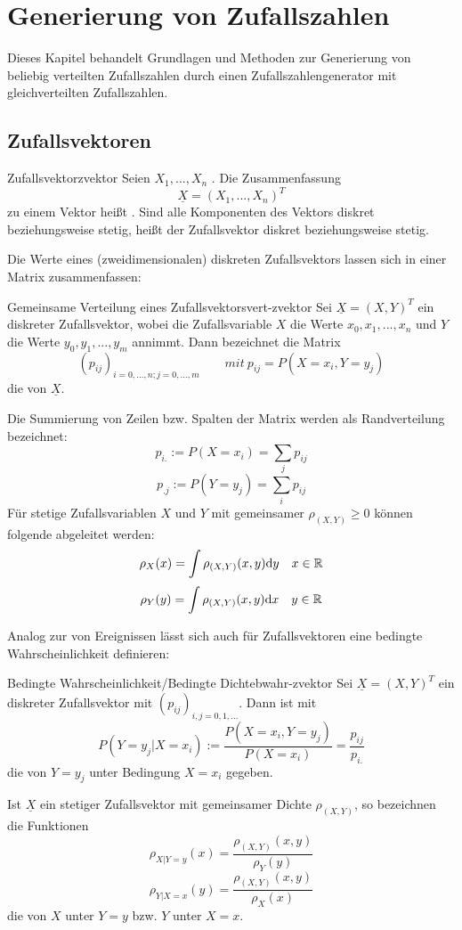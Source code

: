 \chapter{Generierung von Zufallszahlen}

Dieses Kapitel behandelt Grundlagen und Methoden zur Generierung von beliebig
verteilten Zufallszahlen durch einen Zufallszahlengenerator mit gleichverteilten
Zufallszahlen.

\section{Zufallsvektoren}

\begin{definition}{Zufallsvektor}{zvektor}
Seien $X_1, ..., X_n$ . Die Zusammenfassung
\[\underline{X} = (X_1, ..., X_n)^T\]
zu einem Vektor heißt . Sind alle Komponenten des Vektors
diskret beziehungsweise stetig, heißt der Zufallsvektor diskret beziehungsweise
stetig.
\end{definition}

Die Werte eines (zweidimensionalen) diskreten Zufallsvektors lassen sich in einer Matrix
zusammenfassen:

\begin{definition}{Gemeinsame Verteilung eines Zufallsvektors}{vert-zvektor}
Sei $\underline{X} = (X, Y)^T$ ein diskreter Zufallsvektor, wobei die
Zufallsvariable $X$ die Werte $x_0, x_1, ..., x_n$ und $Y$ die Werte $y_0, y_1, ...,
y_m$ annimmt. Dann bezeichnet die Matrix
\[(p_{ij})_{i=0,...,n;j=0,...,m} \qquad mit\ p_{ij} = P(X=x_i, Y=y_j)\]
die  von $\underline{X}$.
\end{definition}

Die Summierung von Zeilen bzw. Spalten der Matrix werden als Randverteilung
bezeichnet:
\[p_{i.}:=P(X=x_i) = \sum_j p_{ij}\]
\[p_{.j}:=P(Y=y_j) = \sum_i p_{ij}\]
Für stetige Zufallsvariablen $X$ und $Y$ mit gemeinsamer 
$\rho_{(X, Y)}\ge 0$ können folgende  abgeleitet werden:
\[\rho_X(x) = \int\rho_{(X,Y)}(x,y)\mathrm{d} y\quad x\in\mathbb{R}\]
\[\rho_Y(y) = \int\rho_{(X,Y)}(x,y)\mathrm{d} x\quad y\in\mathbb{R}\]

Analog zur  von Ereignissen lässt sich
auch für Zufallsvektoren eine bedingte Wahrscheinlichkeit definieren:

\begin{definition}{Bedingte Wahrscheinlichkeit/Bedingte Dichte}{bwahr-zvektor}
Sei $\underline{X} = (X, Y)^T$ ein diskreter Zufallsvektor mit
 $(p_{ij})_{i,j=0,1,...}$. Dann ist
mit
\[P(Y=y_j|X=x_i) := \frac{P(X=x_i, Y=y_j)}{P(X=x_i)} = \frac{p_{ij}}{p_{i.}}\]
die  von $Y=y_j$ unter Bedingung $X=x_i$ gegeben.

Ist $\underline{X}$ ein stetiger Zufallsvektor mit gemeinsamer Dichte
$\rho_{(X,Y)}$, so bezeichnen die Funktionen
\[\rho_{X|Y=y}(x) = \frac{\rho_{(X,Y)}(x,y)}{\rho_Y(y)}\]
\[\rho_{Y|X=x}(y) = \frac{\rho_{(X,Y)}(x,y)}{\rho_X(x)}\]
die  von $X$ unter $Y=y$ bzw. $Y$ unter $X=x$.
\end{definition}

